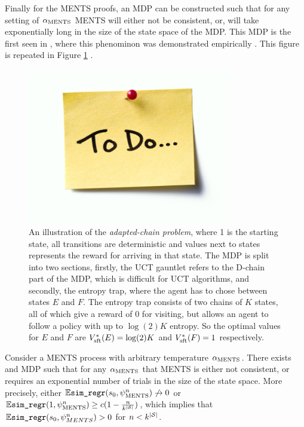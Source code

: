     
    Finally for the MENTS proofs, an MDP can be constructed such that for any setting of ${\alpha_{{\textnormal{MENTS}}}}$ MENTS will either not be consistent, or, will take exponentially long in the size of the state space of the MDP. This MDP is the  first seen in , where this phenominon was demonstrated empirically . This figure is repeated in Figure \ref{fig:adapted_chain} .



    \begin{figure}
        \centering
        \includegraphics[width=0.8\textwidth]{figures/todo.jpg}
        \caption{ An illustration of the \textit{adapted-chain problem}, where 1 is the starting state, all transitions are deterministic and values next to states represents the reward for arriving in that state. The MDP is split into two sections, firstly, the UCT gauntlet refers to the D-chain part of the MDP, which is difficult for UCT algorithms, and secondly, the entropy trap, where the agent has to chose between states $E$ and $F$. The entropy trap consists of two chains of $K$ states, all of which give a reward of $0$ for visiting, but allows an agent to follow a policy with up to $\log(2)K$ entropy. So the optimal values for $E$ and $F$ are $V_{{\textnormal{sft}}}^*(E)=\log(2)K$ and $V_{{\textnormal{sft}}}^*(F)=1$ respectively.}
        \label{fig:adapted_chain}
    \end{figure}
    
    
    
    \begin{theorem} \label{thrm:ments_bad_mdp}
        Consider a MENTS process with arbitrary temperature ${\alpha_{{\textnormal{MENTS}}}}$. There exists and MDP such that for any ${\alpha_{{\textnormal{MENTS}}}}$ that MENTS is either not consistent, or requires an exponential number of trials in the size of the state space. More precisely, either $\mathbb{E}{\textnormal{\texttt{sim\_regr}}}(s_0,\psi^{n}_{{\textnormal{MENTS}}})\not\rightarrow 0$ or $\mathbb{E}{\textnormal{\texttt{sim\_regr}}}(1,\psi^{n}_{{\textnormal{MENTS}}}) \geq c(1 - \frac{n}{k^{|\mathcal{S}|}})$, which implies that $\mathbb{E}{\textnormal{\texttt{sim\_regr}}}(s_0,\psi^n_{MENTS})>0$ for $n<k^{|\mathcal{S}|}$. 
    \end{theorem}
    
